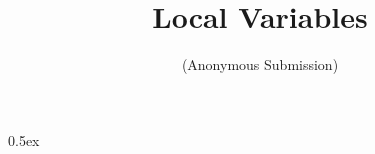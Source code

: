 \documentclass[11pt,a4paper]{article}
\begin{document}
\title{Local Variables}
\author{(Anonymous Submission)}
\maketitle

\tableofcontents

\parindent 0pt\parskip 0.5ex



%
%
\end{document}
